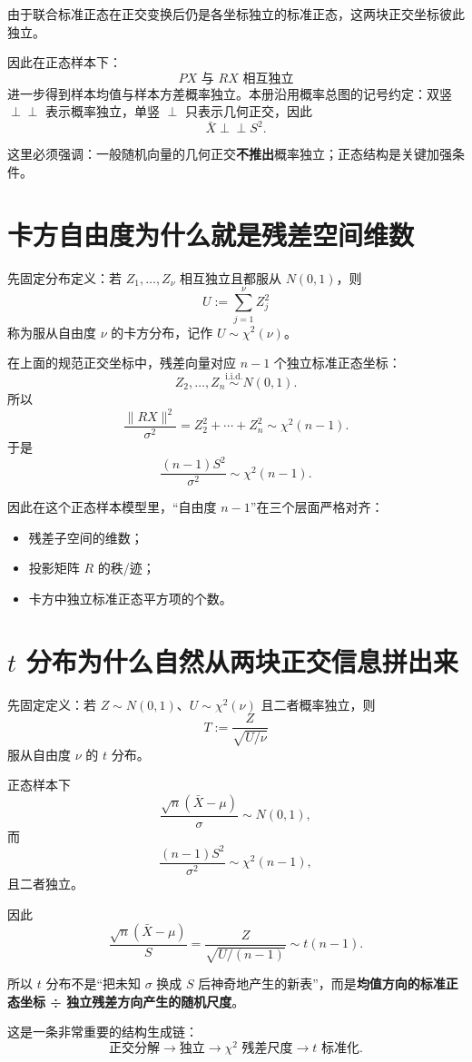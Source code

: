 \documentclass[profile=standard]{ipara-handbook}
\begin{document}
由于联合标准正态在正交变换后仍是各坐标独立的标准正态，这两块正交坐标彼此独立。

因此在正态样本下：
\[
\boxed{PX\text{ 与 }RX\text{ 相互独立}}
\]
进一步得到样本均值与样本方差概率独立。本册沿用概率总图的记号约定：双竖 $\perp\!\!\!\perp$ 表示概率独立，单竖 $\perp$ 只表示几何正交，因此
\[
\boxed{\bar X\perp\!\!\!\perp S^2.}
\]

这里必须强调：一般随机向量的几何正交\textbf{不推出}概率独立；正态结构是关键加强条件。

\section{卡方自由度为什么就是残差空间维数}
先固定分布定义：若 $Z_1,\dots,Z_\nu$ 相互独立且都服从 $N(0,1)$，则
\[
U:=\sum_{j=1}^{\nu}Z_j^2
\]
称为服从自由度 $\nu$ 的卡方分布，记作 $U\sim\chi^2(\nu)$。

在上面的规范正交坐标中，残差向量对应 $n-1$ 个独立标准正态坐标：
\[
Z_2,\dots,Z_n\overset{\mathrm{i.i.d.}}\sim N(0,1).
\]
所以
\[
\frac{\lVert RX\rVert^2}{\sigma^2}
=Z_2^2+\cdots+Z_n^2
\sim\chi^2(n-1).
\]
于是
\[
\boxed{
\frac{(n-1)S^2}{\sigma^2}
\sim\chi^2(n-1).
}
\]

因此在这个正态样本模型里，“自由度 $n-1$”在三个层面严格对齐：
\begin{itemize}
\item 残差子空间的维数；
\item 投影矩阵 $R$ 的秩/迹；
\item 卡方中独立标准正态平方项的个数。
\end{itemize}

\section{$t$ 分布为什么自然从两块正交信息拼出来}
先固定定义：若 $Z\sim N(0,1)$、$U\sim\chi^2(\nu)$ 且二者概率独立，则
\[
T:=\frac{Z}{\sqrt{U/\nu}}
\]
服从自由度 $\nu$ 的 $t$ 分布。

正态样本下
\[
\frac{\sqrt n(\bar X-\mu)}{\sigma}\sim N(0,1),
\]
而
\[
\frac{(n-1)S^2}{\sigma^2}\sim\chi^2(n-1),
\]
且二者独立。

因此
\[
\frac{\sqrt n(\bar X-\mu)}{S}
=\frac{Z}{\sqrt{U/(n-1)}}
\sim t(n-1).
\]

所以 $t$ 分布不是“把未知 $\sigma$ 换成 $S$ 后神奇地产生的新表”，而是\textbf{均值方向的标准正态坐标 ÷ 独立残差方向产生的随机尺度}。

这是一条非常重要的结构生成链：
\[
\boxed{\text{正交分解}\to\text{独立}\to\chi^2\text{ 残差尺度}\to t\text{ 标准化}.}
\]
\end{document}
